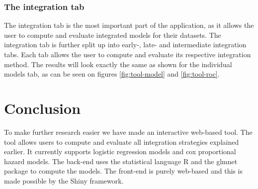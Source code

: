 \subsubsection{The integration tab}
The integration tab is the most important part of the application, as it allows the user to compute and evaluate integrated models for their datasets. The integration tab is further split up into early-, late- and intermediate integration tabs. Each tab allows the user to compute and evaluate its respective integration method. The results will look exactly the same as shown for the individual models tab, as can be seen on figures \ref{fig:tool-model} and \ref{fig:tool-roc}.

\section{Conclusion}
\label{sec:tool-conclusion}
To make further research easier we have made an interactive web-based tool. The tool allows users to compute and evaluate all integration strategies explained earlier. It currently supports logistic regression models and cox proportional hazard models. The back-end uses the statistical language R and the glmnet package to compute the models. The front-end is purely web-based and this is made possible by the Shiny framework.

